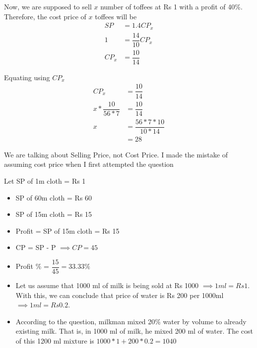 Now, we are supposed to sell $x$ number of toffees at Rs 1 with a profit of 40\%. Therefore, the cost price of $x$ toffees will be 
\begin{align*}
    SP &= 1.4CP_x \\
    1 &= \dfrac{14}{10} CP_x \\
    CP_x &= \dfrac{10}{14}
\end{align*}

Equating using $CP_x$
\begin{align*}
    CP_x &= \dfrac{10}{14} \\
    x * \dfrac{10}{56 * 7} &= \dfrac{10}{14} \\
    x &= \dfrac{56 * 7 * 10}{10 * 14} \\
    &= 28
\end{align*}


\begin{NOTE}
    We are talking about Selling Price, not Cost Price. I made the mistake of assuming cost price when I first attempted the question
\end{NOTE}

Let SP of 1m cloth = Rs 1
\begin{itemize}
    \item SP of 60m cloth = Rs 60
    \item SP of 15m cloth = Rs 15
    \item Profit = SP of 15m cloth = Rs 15
    \item CP = SP - P $\implies CP = 45$
    \item Profit \% = $\dfrac{15}{45} = 33.33\%$
\end{itemize}


\begin{itemize}
    \item Let us assume that 1000 ml of milk is being sold at Rs 1000 $\implies 1 ml = Rs 1$. With this, we can conclude that price of water is Rs 200 per 1000ml $\implies 1 ml = Rs 0.2$.
    
    \item According to the question, milkman mixed 20\% water by volume to already existing milk. That is, in 1000 ml of milk, he mixed 200 ml of water. The cost of this 1200 ml mixture is $1000 * 1 + 200 * 0.2 = 1040$
    
\end{itemize}

